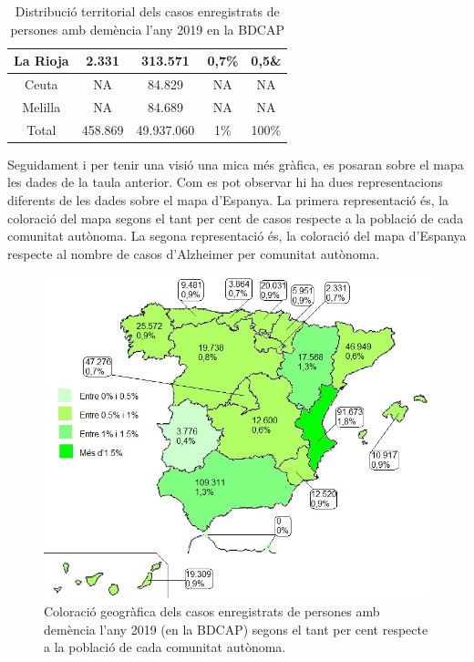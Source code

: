 \documentclass[a4paper,12pt]{report}
\begin{document}
\begin{table}[h]
\begin{tabular}{ |c | c | c | c | c| }
          \hline
         La Rioja & 2.331 & 313.571 & 0,7\% & 0,5\& \\ 
          \hline
         Ceuta & NA & 84.829 & NA  & NA \\ 
          \hline
         Melilla & NA & 84.689 & NA  & NA \\
          \hline
        Total & 458.869 & 49.937.060 & 1\% & 100\% \\
          \hline
    \end{tabular}
    \caption{Distribució territorial dels casos enregistrats de persones amb demència l'any 2019 en la BDCAP}
    \label{tab:taula1}
\end{table}

Seguidament i per tenir una visió una mica més gràfica, es posaran sobre el mapa les dades de la taula anterior. Com es pot observar hi ha dues representacions diferents de les dades sobre el mapa d'Espanya. La primera representació és, la coloració del mapa segons el tant per cent de casos respecte a la població de cada comunitat autònoma. La segona representació és, la coloració del mapa d'Espanya respecte al nombre de casos d'Alzheimer per comunitat autònoma.
\begin{figure}[H]
    \centering
    \includegraphics[scale = 0.6]{images/distribucio territorial en base a percentatge.jpg}
    \caption{Coloració geogràfica dels casos enregistrats de persones amb demència l'any 2019 (en la BDCAP) segons el tant per cent respecte a la població de cada comunitat autònoma.}
    \label{fig:colorpercent}
\end{figure}
\end{document}
